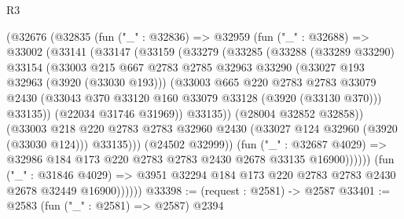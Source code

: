 \begin{lexlean}{R3}
\begin{coremodule}
                  (@32676
                    (@32835
                      (fun ("_" : @32836) =>
                      @32959
                        (fun ("_" : @32688) =>
                        @33002
                          (@33141
                            (@33147
                              (@33159
                                (@33279
                                  (@33285
                                    (@33288
                                      (@33289 @33290)
                                      @33154
                                      (@33003
                                        @215
                                        @667
                                        @2783
                                        @2785
                                        @32963
                                        @33290
                                        (@33027 @193 @32963 (@3920 (@33030 @193)))
                                        (@33003
                                          @665
                                          @220
                                          @2783
                                          @2783
                                          @33079
                                          @2430
                                          (@33043
                                            @370
                                            @33120
                                            @160
                                            @33079
                                            @33128
                                            (@3920 (@33130 @370)))
                                          @33135))
                                      (@22034 @31746 @31969))
                                    @33135))
                                (@28004 @32852 @32858))
                              (@33003
                                @218
                                @220
                                @2783
                                @2783
                                @32960
                                @2430
                                (@33027 @124 @32960 (@3920 (@33030 @124)))
                                @33135)))
                          (@24502 @32999))
                        (fun ("_" : @32687 @4029) =>
                        @32986 @184 @173 @220 @2783 @2783 @2430 @2678 @33135 @16900))))))
              (fun ("_" : @31846 @4029) =>
              @3951 @32294 @184 @173 @220 @2783 @2783 @2430 @2678 @32449 @16900))))))
@33398 := (request : @2581) -> @2587
@33401 := @2583 (fun ("_" : @2581) => @2587) @2394

\end{coremodule}
\end{lexlean}
